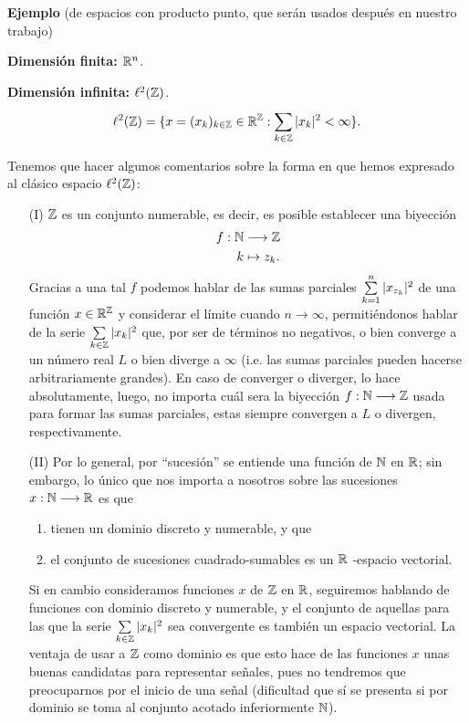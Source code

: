 \textbf{Ejemplo}
(de espacios con producto punto, que serán usados después en nuestro trabajo)

\textbf{Dimensión finita: $\mathbb{R}^{n}$}. 

\textbf{Dimensión infinita: $\ell^{2}(\mathbb{Z})$}. 
\[
\ell^{2}(\mathbb{Z}) = \{ x=(x_{k})_{k \in \mathbb{Z}} \in \mathbb{R}^{\mathbb{Z}} :
\sum\limits_{k \in \mathbb{Z}}^{}|x_{k}|^{2} < \infty\}.
 \]
 
Tenemos que hacer algunos comentarios sobre la forma
en que hemos expresado al clásico espacio $\ell^{2}(\mathbb{Z})$:

\begin{itemize}
	\item[(I)] $\mathbb{Z}$ es un conjunto numerable,
	es decir, es posible establecer una biyección
	\[
	\begin{split}
	f: \mathbb{N} & \longrightarrow \mathbb{Z} \\
	k & \mapsto z_{k}.
	\end{split}
	\]
	Gracias a una tal $f$ podemos hablar de las sumas
	parciales $\sum\limits_{k=1}^{n}|x_{z_{k}}|^{2}$ de una
	función $x \in \mathbb{R}^{\mathbb{Z}}$ y considerar el límite cuando 
	$n \rightarrow \infty $, permitiéndonos hablar de
	la serie $\sum\limits_{k \in \mathbb{Z}}^{}|x_{k}|^{2}$ que,
	por ser de términos no negativos, o bien converge a un 
	número real $L$ o bien diverge a $\infty$ (i.e. las sumas
	parciales pueden hacerse arbitrariamente grandes).
	En caso de converger o diverger, lo hace absolutamente, 
	luego, no importa cuál sera la biyección 
	$f: \mathbb{N} \longrightarrow \mathbb{Z}$ usada para formar
	las sumas parciales, estas siempre convergen a $L$
	o divergen, respectivamente. 
	
	\item[(II)] Por lo general, por ``sucesión'' se 
	entiende una función de $\mathbb{N}$ en $\mathbb{R}$; sin embargo, lo único 
	que nos importa a nosotros sobre las sucesiones 
	$x: \mathbb{N} \longrightarrow \mathbb{R}$ es que
	\begin{enumerate}
		\item tienen un dominio discreto y numerable, y que
		\item el conjunto de sucesiones cuadrado-sumables
		es un $\mathbb{R}$ -espacio vectorial. 
	\end{enumerate}
	Si en cambio consideramos funciones $x$ de
	$\mathbb{Z}$ en $\mathbb{R}$, seguiremos hablando de funciones
	con dominio discreto y numerable, y el conjunto
	de aquellas para las que la serie 
	$\sum\limits_{k \in \mathbb{Z}}^{}|x_{k}|^{2} $ sea convergente
	es también un espacio vectorial. La ventaja de usar
	a $\mathbb{Z}$ como dominio es que esto hace de las funciones
	$x$ unas buenas candidatas para representar señales,
	pues no tendremos que preocuparnos por el inicio de
	una señal (dificultad que sí se presenta si por dominio
	se toma al conjunto acotado inferiormente $\mathbb{N}$).
\end{itemize}



